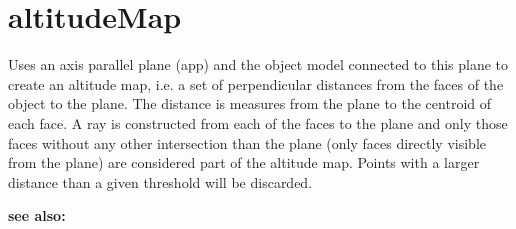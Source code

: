 \documentclass[letterpaper,10pt,english]{sphinxmanual}
\begin{document}
\section{altitudeMap}
\label{pk_src.altitudeMap:altitudemap}\label{pk_src.altitudeMap::doc}\label{pk_src.altitudeMap:id1}
{\hyperref[index:commands]{}}
\label{pk_src.altitudeMap:module-pk_src.altitudeMap}
Uses an axis parallel plane (app) and the object model connected to this plane to create an altitude map, i.e. a set of perpendicular distances from the faces of the object to the plane. The distance is measures from the plane to the centroid of each face. A ray is constructed from each of the faces to the plane and only those faces without any other intersection than the plane (only faces directly visible from the plane) are considered part of the altitude map.
Points with a larger distance than a given threshold will be discarded.

\textbf{see also:} {\hyperref[pk_src.axisParallelPlane:axisparallelplane]{}}
\end{document}
